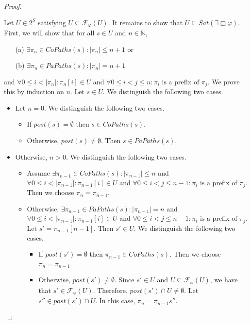 \documentclass[12pt]{article}
\newcommand{\always}{\Box}
\theoremstyle{definition}
\newenvironment{franck}{\color{red}}{\color{black}}
\begin{document}
\begin{proof}
\begin{itemize}
\begin{franck}
\begin{itemize}
Let $U \in 2^S$ satisfying $U \subseteq \mathcal{F}_{\varphi}(U)$.  It remains to show that $U \subseteq \mathit{Sat}(\exists \always \varphi)$.  First, we will show that for all $s \in U$ and $n \in \mathbb{N}$,
\begin{itemize}
\item[(a)]
$\exists \pi_n \in \mathit{CoPaths}(s) : |\pi_n| \leq n + 1$ or
\item[(b)]
$\exists \pi_n \in \mathit{PaPaths}(s) : |\pi_n| = n + 1$
\end{itemize}
and $\forall 0 \leq i < |\pi_n| : \pi_n[i] \in U$ and $\forall 0 \leq i < j \leq n: \pi_i \mbox{ is a prefix of } \pi_j$.  We prove this by induction on $n$.  Let $s \in U$.  We distinguish the following two cases.
\begin{itemize}
\item 
Let $n = 0$.  We distinguish the following two cases.
\begin{itemize}
\item 
If $\mathit{post}(s) = \emptyset$ then $s \in \mathit{CoPaths}(s)$.
\item
Otherwise, $\mathit{post}(s) \not= \emptyset$.  Then $s \in \mathit{PaPaths}(s)$.
\end{itemize} 
\item
Otherwise, $n > 0$.  We distinguish the following two cases.
\begin{itemize}
\item 
Assume $\exists \pi_{n-1} \in \mathit{CoPaths}(s) : |\pi_{n-1}| \leq n$ and $\forall 0 \leq i < |\pi_{n-1}| : \pi_{n-1}[i] \in U$ and $\forall 0 \leq i < j \leq n - 1: \pi_i \mbox{ is a prefix of } \pi_j$.  Then we choose $\pi_n = \pi_{n-1}$.
\item
Otherwise, $\exists \pi_{n-1} \in \mathit{PaPaths}(s) : |\pi_{n-1}| = n$  and $\forall 0 \leq i < |\pi_{n-1}| : \pi_{n-1}[i] \in U$ and $\forall 0 \leq i < j \leq n - 1: \pi_i \mbox{ is a prefix of } \pi_j$.  Let $s' = \pi_{n-1}[n-1]$.  Then $s' \in U$.  We distinguish the following two cases.
\begin{itemize}
\item 
If $\mathit{post}(s') = \emptyset$ then $\pi_{n-1} \in CoPaths(s)$.  Then we choose $\pi_n = \pi_{n-1}$.
\item
Otherwise, $\mathit{post}(s') \not= \emptyset$.  Since $s' \in U$ and $U \subseteq \mathcal{F}_{\varphi}(U)$, we have that $s' \in \mathcal{F}_{\varphi}(U)$.  Therefore, $\mathit{post}(s') \cap U \not= \emptyset$.  Let $s'' \in \mathit{post}(s') \cap U$.  In this case, $\pi_n = \pi_{n-1} s''$.

\end{itemize}
\end{itemize}
\end{itemize}
\end{itemize}
\end{franck}
\end{itemize}
\end{proof}
\end{document}
